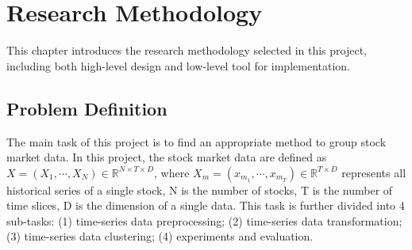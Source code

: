\chapter{Research Methodology}
\label{ch:Methodology}
This chapter introduces the research methodology selected in this project, including both high-level design and low-level tool for implementation.
\section{Problem Definition}

The main task of this project is to find an appropriate method to group stock market data. In this project, the stock market data are defined as $X = (X_1, \cdots, X_N) \in \mathbb{R}^{N \times T \times D} $, where $X_m = (x_{m_1},\cdots, x_{m_T}) \in \mathbb{R}^{T \times D} $ represents all historical series of a single stock, N is the number of stocks, T is the number of time slices, D is the dimension of a single data. This task is further divided into 4 sub-tasks: (1) time-series data preprocessing; (2) time-series data transformation; (3) time-series data clustering; (4) experiments and evaluation.

